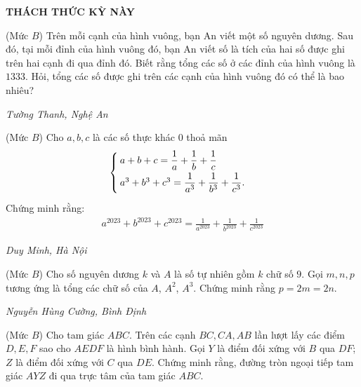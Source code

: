 \begin{center}
	\vspace*{-5pt}
	\textbf{\color{thachthuctoanhoc}\color{thachthuctoanhoc}\color{thachthuctoanhoc}THÁCH THỨC KỲ NÀY}
	\vspace*{-5pt}
\end{center}
\begin{multicols}{2}
	\setlength{\abovedisplayskip}{4pt}
	\setlength{\belowdisplayskip}{4pt}
	{}
	(Mức $B$) Trên mỗi cạnh của hình vuông, bạn An viết một số nguyên dương. Sau đó, tại mỗi đỉnh của hình vuông đó, bạn An viết số là tích của hai số được ghi trên hai cạnh đi qua đỉnh đó. Biết rằng tổng các số ở các đỉnh của hình vuông là $1333$. Hỏi, tổng các số được ghi trên các cạnh của hình vuông đó có thể là bao nhiêu?
	\begin{flushright}
		\textit{Tường Thanh, Nghệ An}
	\end{flushright}
	{}
	(Mức $B$) Cho $a,b,c$ là các số thực khác $0$ thoả mãn 
	\begin{align*}
		\begin{cases}
			a+b+c=\dfrac1a+\dfrac1b+\dfrac1c\vspace*{3pt}&\\
			a^3+b^3+c^3=\dfrac1{a^3}+\dfrac1{b^3}+\dfrac1{c^3}.\vspace*{3pt}
		\end{cases}
	\end{align*}
	Chứng minh rằng:
	\begin{align*}
		a^{2023}\!+\!b^{2023}\!+\!c^{2023}\!=\!\frac1{a^{2023}}\!+\!\frac1{b^{2023}}\!+\!\frac1{c^{2023}}
	\end{align*}
	\begin{flushright}
		\textit{Duy Minh, Hà Nội}
	\end{flushright}
	{}
	(Mức $B$) Cho số nguyên dương $k$ và  $A$ là số tự nhiên gồm $k$ chữ số $9$. Gọi $m,n,p$ tương ứng là tổng các chữ số của $A$, $A^2$, $A^3$. Chứng minh rằng $p=2m=2n$. 
	\begin{flushright}
		\textit{Nguyễn Hùng Cường, Bình Định}
	\end{flushright}
	{}
	(Mức $B$) Cho tam giác $A B C$. Trên các cạnh $B C, C A, A B$ lần lượt lấy các điểm $D, E, F$ sao cho $A E D F$ là hình bình hành. Gọi $Y$ là điểm đối xứng với $B$ qua $D F$; $Z$ là điểm đối xứng với $C$ qua $D E$. Chứng minh rằng,  đường tròn ngoại tiếp tam giác $A Y Z$ đi qua trực tâm của tam giác $A B C$.

\end{multicols}
